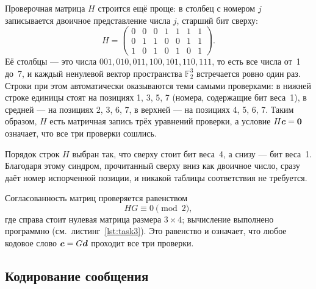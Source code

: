 \documentclass[a4paper,14pt]{extarticle}
\begin{document}
Проверочная матрица $H$ строится ещё проще: в столбец с номером $j$ записывается
двоичное представление числа $j$, старший бит сверху:
\begin{equation}
  H = \begin{pmatrix} 0&0&0&1&1&1&1 \\ 0&1&1&0&0&1&1 \\ 1&0&1&0&1&0&1 \end{pmatrix}.
  \label{eq:H}
\end{equation}
Её столбцы --- это числа $001, 010, 011, 100, 101, 110, 111$, то есть все числа от~1
до~7, и каждый ненулевой вектор пространства $\mathbb{F}_2^3$ встречается ровно один
раз. Строки при этом автоматически оказываются теми самыми проверками: в нижней строке
единицы стоят на позициях 1, 3, 5, 7 (номера, содержащие бит веса~1), в средней ---
на позициях 2, 3, 6, 7, в верхней --- на позициях 4, 5, 6, 7. Таким образом, $H$ есть
матричная запись трёх уравнений проверки, а условие $H\boldsymbol{c} = \boldsymbol{0}$ означает,
что все три проверки сошлись.

Порядок строк $H$ выбран так, что сверху стоит бит веса~4, а снизу --- бит веса~1.
Благодаря этому синдром, прочитанный сверху вниз как двоичное число, сразу даёт номер
испорченной позиции, и никакой таблицы соответствия не требуется.

Согласованность матриц проверяется равенством
\begin{equation}
  HG \equiv 0 \pmod 2 ,
  \label{eq:HG}
\end{equation}
где справа стоит нулевая матрица размера $3 \times 4$; вычисление выполнено программно
(см.~листинг~\ref{lst:task3}). Это равенство и означает, что любое кодовое слово
$\boldsymbol{c} = G\boldsymbol{d}$ проходит все три проверки.

\subsection{Кодирование сообщения}
\end{document}
